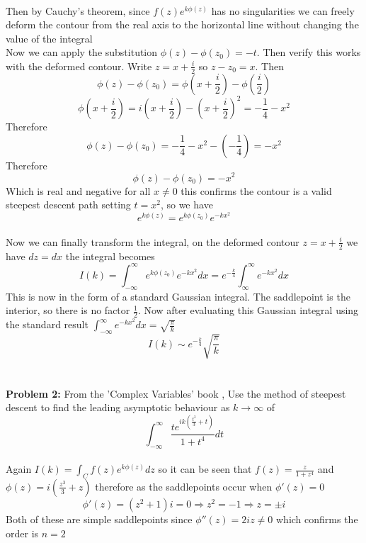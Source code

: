 \\
Then by Cauchy's theorem, since $f(z)e^{k\phi(z)}$ has no singularities we can freely deform the contour from the real axis to the horizontal line without changing the value of the integral 
\\
Now we can apply the substitution $\phi(z)-\phi(z_0)=-t$. Then verify this works with the deformed contour. Write $z=x+\frac{i}{2}$ so $z-z_0=x$. Then 
\begin{equation}
    \phi(z)-\phi(z_0)=\phi\left(x+\frac{i}{2}\right)-\phi\left(\frac{i}{2}\right)
\end{equation}
$$\phi\left(x+\frac{i}{2}\right)=i\left(x+\frac{i}{2}\right)-\left(x+\frac{i}{2}\right)^2=-\frac{1}{4}-x^2$$ Therefore $$\phi(z)-\phi(z_0)=-\frac{1}{4}-x^2-\left(-\frac{1}{4}\right)=-x^2$$ Therefore 
\begin{equation}
    \phi(z)-\phi(z_0)=-x^2
\end{equation}
Which is real and negative for all $x\neq0$ this confirms the contour is a valid steepest descent path setting $t=x^2$, so we have 
\begin{equation}
    e^{k\phi(z)}=e^{k\phi(z_0)}e^{-kx^2}
\end{equation} 
\\
Now we can finally transform the integral, on the deformed contour $z=x+\frac{i}{2}$ we have $dz=dx$ the integral becomes 
\begin{equation}
    I(k)=\int^{\infty}_{-\infty}e^{k\phi(z_0)}e^{-kx^2}dx=e^{-\frac{k}{4}}\int^{\infty}_{\infty}e^{-kx^2}dx
\end{equation}
This is now in the form of a standard Gaussian integral. The saddlepoint is the interior, so there is no factor $\frac{1}{2}$. Now after evaluating this Gaussian integral using the standard result $\int^{\infty}_{-\infty}e^{-kx^2}dx=\sqrt{\frac{\pi}{k}}$ 
\begin{equation}
    I(k)\sim e^{-\frac{k}{4}}\sqrt{\frac{\pi}{k}}
\end{equation}
\\
\\
\textbf{Problem 2:} From the 'Complex Variables' book \cite{RedBook}, Use the method of steepest descent to find the leading asymptotic behaviour as $k\to\infty$ of 
\begin{equation}
    \int^{\infty}_{-\infty}\frac{te^{ik(\frac{t^3}{3}+t)}}{1+t^4}dt
\end{equation}
\\
Again $I(k)=\int_Cf(z)e^{k\phi(z)}dz$ so it can be seen that $f(
z)=\frac{z}{1+z^4}$ and $\phi(z)=i\left(\frac{z^3}{3}+z\right)$ therefore as the saddlepoints occur when $\phi'(z)=0$ $$\phi'(z)=(z^2+1)i=0\Rightarrow z^2=-1\Rightarrow z=\pm i$$ Both of these are simple saddlepoints since $\phi''(z)=2iz\neq0$ which confirms the order is $n=2$ 
